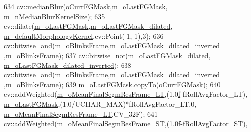 \begin{DoxyCode}
634     cv::medianBlur(oCurrFGMask,\mbox{\hyperlink{class_background_subtractor_l_b_s_p_adb6dc0af596c5592c91f9d8faa5c8a4b}{m\_oLastFGMask}},
      \mbox{\hyperlink{class_background_subtractor_su_b_s_e_n_s_e_a796120fecb11f00914925e14065ee5ab}{m\_nMedianBlurKernelSize}});
635     cv::dilate(\mbox{\hyperlink{class_background_subtractor_l_b_s_p_adb6dc0af596c5592c91f9d8faa5c8a4b}{m\_oLastFGMask}},\mbox{\hyperlink{class_background_subtractor_su_b_s_e_n_s_e_a2dc6a8f1c8e2694d19dbbb74c533e293}{m\_oLastFGMask\_dilated}},
      \mbox{\hyperlink{class_background_subtractor_su_b_s_e_n_s_e_ae360b93378aa04b34aebc23b5f6e6714}{m\_defaultMorphologyKernel}},cv::Point(-1,-1),3);
636     cv::bitwise\_and(\mbox{\hyperlink{class_background_subtractor_su_b_s_e_n_s_e_a943b50c63d233c0948d82b64390f1aa1}{m\_oBlinksFrame}},\mbox{\hyperlink{class_background_subtractor_su_b_s_e_n_s_e_a0306555d3e97ceec32f8f6b495d18b95}{m\_oLastFGMask\_dilated\_inverted}}
      ,\mbox{\hyperlink{class_background_subtractor_su_b_s_e_n_s_e_a943b50c63d233c0948d82b64390f1aa1}{m\_oBlinksFrame}});
637     cv::bitwise\_not(\mbox{\hyperlink{class_background_subtractor_su_b_s_e_n_s_e_a2dc6a8f1c8e2694d19dbbb74c533e293}{m\_oLastFGMask\_dilated}},
      \mbox{\hyperlink{class_background_subtractor_su_b_s_e_n_s_e_a0306555d3e97ceec32f8f6b495d18b95}{m\_oLastFGMask\_dilated\_inverted}});
638     cv::bitwise\_and(\mbox{\hyperlink{class_background_subtractor_su_b_s_e_n_s_e_a943b50c63d233c0948d82b64390f1aa1}{m\_oBlinksFrame}},\mbox{\hyperlink{class_background_subtractor_su_b_s_e_n_s_e_a0306555d3e97ceec32f8f6b495d18b95}{m\_oLastFGMask\_dilated\_inverted}}
      ,\mbox{\hyperlink{class_background_subtractor_su_b_s_e_n_s_e_a943b50c63d233c0948d82b64390f1aa1}{m\_oBlinksFrame}});
639     \mbox{\hyperlink{class_background_subtractor_l_b_s_p_adb6dc0af596c5592c91f9d8faa5c8a4b}{m\_oLastFGMask}}.copyTo(oCurrFGMask);
640     cv::addWeighted(\mbox{\hyperlink{class_background_subtractor_su_b_s_e_n_s_e_ad48e92b6d6bbce34f9f452484bc9956a}{m\_oMeanFinalSegmResFrame\_LT}},(1.0\mbox{\hyperlink{rings_8cpp_a77369fc4d5326a16d2c603e032023528}{f}}-fRollAvgFactor\_LT),
      \mbox{\hyperlink{class_background_subtractor_l_b_s_p_adb6dc0af596c5592c91f9d8faa5c8a4b}{m\_oLastFGMask}},(1.0/UCHAR\_MAX)*fRollAvgFactor\_LT,0,
      \mbox{\hyperlink{class_background_subtractor_su_b_s_e_n_s_e_ad48e92b6d6bbce34f9f452484bc9956a}{m\_oMeanFinalSegmResFrame\_LT}},CV\_32F);
641     cv::addWeighted(\mbox{\hyperlink{class_background_subtractor_su_b_s_e_n_s_e_a0dcd4f5df8adb9b4fa630a9a6f6b5e30}{m\_oMeanFinalSegmResFrame\_ST}},(1.0\mbox{\hyperlink{rings_8cpp_a77369fc4d5326a16d2c603e032023528}{f}}-fRollAvgFactor\_ST),

\end{DoxyCode}
